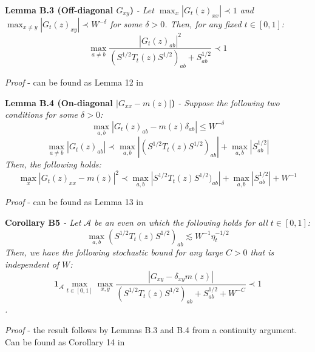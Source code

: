 \documentclass[11pt]{article}
\newenvironment{boxtheorem}[1]
  {\begin{mdframed}\noindent\textbf{#1}\itshape\space}
  {\end{mdframed}}
\begin{document}
\begin{boxtheorem}{Lemma B.3 (Off-diagonal $G_{xy}$)} \label{lemma-b3} - Let $\max_x|G_t(z)_{xx}|\prec 1$ and $\max_{x\neq y}|G_t(z)_{xy}|\prec W^{-\delta}$ for some $\delta>0$. Then, for any fixed $t\in [0, 1]$:$$\max_{a\neq b} \frac{|G_t(z)_{ab}|^2}{(S^{1/2}T_t(z)S^{1/2})_{ab}+S_{ab}^{1/2}}\prec 1$$

\end{boxtheorem}
\textit{Proof} - can be found as Lemma 12 in \cite{bandSDE}\label{lemma-b4}
\begin{boxtheorem}{Lemma B.4 (On-diagonal $|G_{xx}-m(z)|$)} - Suppose the following two conditions for some $\delta>0$:$$\max_{a,b}|G_t(z)_{ab}-m(z)\delta_{ab}|\leq W^{-\delta}$$
$$\max_{a\neq b}|G_t(z)_{ab}|\prec \max_{a, b}|(S^{1/2}T_t(z)S^{1/2})_{ab}|+\max_{a, b}|S_{ab}^{1/2}|$$
Then, the following holds: $$\max_x |G_t(z)_{xx} - m(z)|^2\prec \max_{a, b}|S^{1/2}T_t(z)S^{1/2})_{ab}|+\max_{a,b}|S_{ab}^{1/2}|+W^{-1}$$

\end{boxtheorem}
\textit{Proof} - can be found as Lemma 13 in \cite{bandSDE}

\begin{boxtheorem}{Corollary B5}\label{corollary-b5} - Let $\mathcal{A}$ be an even on which the following holds for all $t\in [0, 1]$: $$\max_{a, b}\left(S^{1/2}T_t(z)S^{1/2}\right)_{ab}\lesssim W^{-1}\eta_t^{-1/2}$$
Then, we have the following stochastic bound for any large $C>0$ that is independent of $W$: $$\mathbf{1}_{\mathcal{A}}\max_{t\in [0, 1]} \max_{x, y}\frac{|G_{xy} - \delta_{xy}m(z)|}{(S^{1/2}T_t(z)S^{1/2})_{ab}+S^{1/2}_{ab}+W^{-C}}\prec 1$$
.
\end{boxtheorem}
\textit{Proof} - the result follows by Lemmas B.3 and B.4 from a continuity argument. Can be found as Corollary 14 in \cite{bandSDE}

\newpage 
{}
\end{document}
